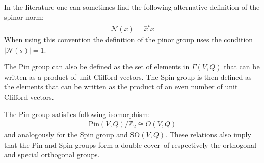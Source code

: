 	\begin{remark}
		In the literature one can sometimes find the following alternative definition of the spinor norm:
		\begin{gather}
			\mathcal{N}(x) = \hat{x}^tx
		\end{gather}
		When using this convention the definition of the pinor group uses the condition $|\mathcal{N}(s)| = 1$.
	\end{remark}

	\begin{adefinition}
		The Pin group can also be defined as the set of elements in $\Gamma(V, Q)$ that can be written as a product of unit Clifford vectors. The Spin group is then defined as the elements that can be written as the product of an even number of unit Clifford vectors.
	\end{adefinition}
	
	\begin{property}\label{clifford:pin_group}
		The Pin group satisfies following isomorphism:
		\begin{gather}
			\text{Pin}(V, Q)/\mathbb{Z}_2 \cong O(V, Q)
		\end{gather}
		and analogously for the Spin group and SO$(V, Q)$. These relations also imply that the Pin and Spin groups form a double cover\footnotemark\ of respectively the orthogonal and special orthogonal groups.
	\end{property}
	
